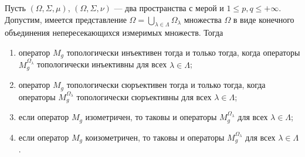 \begin{proposition}\label{MultOpDecompDecomp} Пусть $(\Omega,\Sigma,\mu)$,
$(\Omega,\Sigma,\nu)$ --- два пространства с мерой и $1\leq p,q\leq +\infty$.
Допустим, имеется представление
$\Omega=\bigcup_{\lambda\in\Lambda}\Omega_\lambda$ множества $\Omega$ в виде
конечного объединения непересекающихся измеримых множеств. Тогда 

\begin{enumerate}[label = (\roman*)]
    \item оператор $M_g$ топологически инъективен тогда и только тогда, когда
    операторы $M_g^{\Omega_\lambda}$ топологически инъективны для всех
    $\lambda\in\Lambda$;

    \item оператор $M_g$ топологически сюръективен тогда и только тогда, когда
    операторы $M_g^{\Omega_\lambda}$ топологически сюръективны для всех
    $\lambda\in\Lambda$;

    \item если оператор $M_g$ изометричен, то таковы и операторы
    $M_g^{\Omega_\lambda}$ для всех $\lambda\in\Lambda$;

    \item если оператор $M_g$ коизометричен, то таковы и операторы
    $M_g^{\Omega_\lambda}$ для всех $\lambda\in\Lambda$.
\end{enumerate}
\end{proposition}

